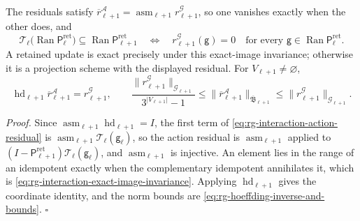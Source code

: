 The residuals satisfy $\overline r^{\mathcal A}_{\ell+1}=\operatorname{asm}_{\ell+1}r^{\mathcal G}_{\ell+1}$,
so one vanishes exactly when the other does, and
\begin{equation}
\mathcal T_\ell\bigl(\operatorname{Ran}\mathsf P^{\mathrm{ret}}_\ell\bigr)
\subseteq\operatorname{Ran}\mathsf P^{\mathrm{ret}}_{\ell+1}
\quad\Longleftrightarrow\quad
r^{\mathcal G}_{\ell+1}(\mathsf g)=0
\quad\text{for every }\mathsf g\in\operatorname{Ran}\mathsf P^{\mathrm{ret}}_\ell .
\label{eq:rg-interaction-exact-image-invariance}
\end{equation}
A retained update is exact precisely under this exact-image invariance; otherwise it
is a projection scheme with the displayed residual. For $V_{\ell+1}\ne\varnothing$,
\begin{equation}
\operatorname{hd}_{\ell+1}\overline r^{\mathcal A}_{\ell+1}=r^{\mathcal G}_{\ell+1},
\qquad
\frac{\lVert r^{\mathcal G}_{\ell+1}\rVert_{\mathcal G_{\ell+1}}}{3^{\lvert V_{\ell+1}\rvert}-1}
\le\lVert\overline r^{\mathcal A}_{\ell+1}\rVert_{\overline{\mathfrak B}_{\ell+1}}
\le\lVert r^{\mathcal G}_{\ell+1}\rVert_{\mathcal G_{\ell+1}}.
\label{eq:rg-interaction-residual-norm-control}
\end{equation}

\noindent\emph{Proof.}
Since $\operatorname{asm}_{\ell+1}\operatorname{hd}_{\ell+1}=I$, the first term of
\eqref{eq:rg-interaction-action-residual} is $\operatorname{asm}_{\ell+1}\mathcal
T_\ell(\mathsf g_\ell)$, so the action residual is $\operatorname{asm}_{\ell+1}$
applied to $(I-\mathsf P^{\mathrm{ret}}_{\ell+1})\mathcal T_\ell(\mathsf g_\ell)$,
and $\operatorname{asm}_{\ell+1}$ is injective. An element lies in the range of an
idempotent exactly when the complementary idempotent annihilates it, which is
\eqref{eq:rg-interaction-exact-image-invariance}. Applying
$\operatorname{hd}_{\ell+1}$ gives the coordinate identity, and the norm bounds are
\eqref{eq:rg-hoeffding-inverse-and-bounds}. $\square$

